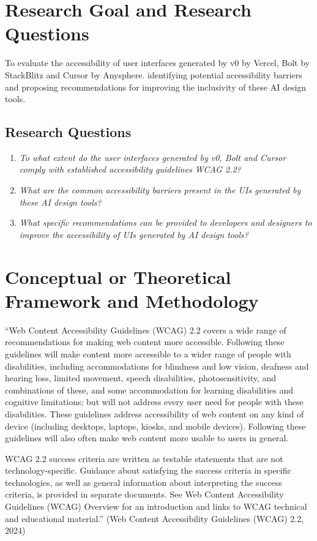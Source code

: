 \documentclass{article}
\begin{document}
\section{Research Goal and Research Questions}
To evaluate the accessibility of user interfaces generated by v0 by Vercel, Bolt by StackBlitz and Cursor by Anysphere.
identifying potential accessibility barriers and proposing recommendations for improving the inclusivity of these AI design tools.

\subsection{Research Questions}

\begin{enumerate}
  \item \textit{To what extent do the user interfaces generated by v0, Bolt and Cursor comply with established accessibility guidelines WCAG 2.2?}
  \item \textit{What are the common accessibility barriers present in the UIs generated by these AI design tools?}
  \item \textit{What specific recommendations can be provided to developers and designers to improve the accessibility of UIs generated by AI design tools?}
\end{enumerate}

\section{Conceptual or Theoretical Framework and Methodology}
“Web Content Accessibility Guidelines (WCAG) 2.2 covers a wide range of recommendations for making web content more accessible.
Following these guidelines will make content more accessible to a wider range of people with disabilities,
including accommodations for blindness and low vision, deafness and hearing loss, limited movement, speech disabilities, photosensitivity,
and combinations of these, and some accommodation for learning disabilities and cognitive limitations;
but will not address every user need for people with these disabilities.
These guidelines address accessibility of web content on any kind of device (including desktops, laptops, kiosks, and mobile devices).
Following these guidelines will also often make web content more usable to users in general.

WCAG 2.2 success criteria are written as testable statements that are not technology-specific.
Guidance about satisfying the success criteria in specific technologies,
as well as general information about interpreting the success criteria, is provided in separate documents.
See Web Content Accessibility Guidelines (WCAG) Overview for an introduction and links to WCAG technical and educational material.”
(Web Content Accessibility Guidelines (WCAG) 2.2, 2024)
\end{document}
